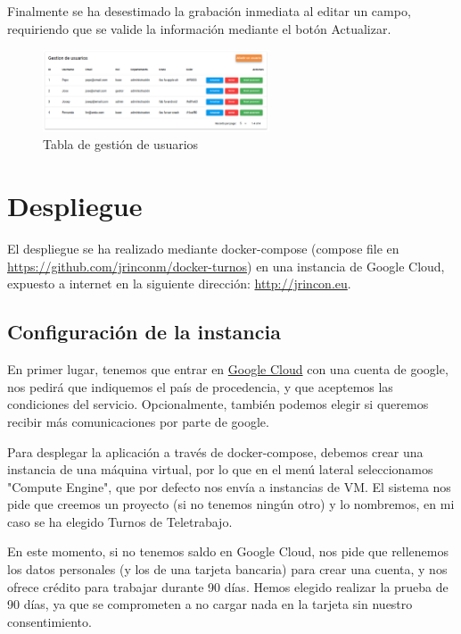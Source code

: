 \documentclass[11pt,spanish,listoffigures,listoftables]{tfgetsinf}
\begin{document}
Finalmente se ha desestimado la grabación inmediata al editar un campo, requiriendo que se valide la información mediante el botón Actualizar.

\begin{figure}[ht!] %
  \includegraphics[width=0.60\textwidth]{img/gestionusuarioweb.png}
  \caption{Tabla de gestión de usuarios}
  \label{fig:gestionusuarios}
\end{figure}

\chapter{Despliegue}

El despliegue se ha realizado mediante docker-compose (compose file en \url{https://github.com/jrinconm/docker-turnos}) en una instancia de Google Cloud, expuesto a internet en la siguiente dirección:
\url{http://jrincon.eu}.

\section{Configuración de la instancia}
En primer lugar, tenemos que entrar en \href{https://console.cloud.google.com/}{Google Cloud} con una cuenta de google, nos pedirá que indiquemos el país de procedencia, y que aceptemos las condiciones del servicio.
Opcionalmente, también podemos elegir si queremos recibir más comunicaciones por parte de google.

Para desplegar la aplicación a través de docker-compose, debemos crear una instancia de una máquina virtual, por lo que en el menú lateral seleccionamos "Compute Engine", que por defecto nos envía a instancias de VM.
El sistema nos pide que creemos un proyecto (si no tenemos ningún otro) y lo nombremos, en mi caso se ha elegido Turnos de Teletrabajo.

En este momento, si no tenemos saldo en Google Cloud, nos pide que rellenemos los datos personales (y los de una tarjeta bancaria) para crear una cuenta, y nos ofrece crédito para trabajar durante 90 días. 
Hemos elegido realizar la prueba de 90 días, ya que se comprometen a no cargar nada en la tarjeta sin nuestro consentimiento.
\end{document}

